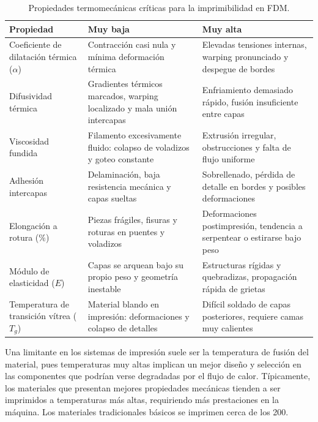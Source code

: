 \begin{table}[h]
  \centering
  \footnotesize
  \begin{tabular}{|p{3cm}|p{5cm}|p{5cm}|}
    \hline
    \textbf{Propiedad} & \textbf{Muy baja} & \textbf{Muy alta} \\
    \hline
    Coeficiente de dilatación térmica (\(\alpha\)) 
      & Contracción casi nula y mínima deformación térmica 
      & Elevadas tensiones internas, warping pronunciado y despegue de bordes \\
    \hline
    Difusividad térmica 
      & Gradientes térmicos marcados, warping localizado y mala unión intercapas 
      & Enfriamiento demasiado rápido, fusión insuficiente entre capas \\
    \hline
    Viscosidad fundida 
      & Filamento excesivamente fluido: colapso de voladizos y goteo constante 
      & Extrusión irregular, obstrucciones y falta de flujo uniforme \\
    \hline
    Adhesión intercapas 
      & Delaminación, baja resistencia mecánica y capas sueltas 
      & Sobrellenado, pérdida de detalle en bordes y posibles deformaciones \\
    \hline
    Elongación a rotura (\(\%\)) 
      & Piezas frágiles, fisuras y roturas en puentes y voladizos 
      & Deformaciones postimpresión, tendencia a serpentear o estirarse bajo peso \\
    \hline
    Módulo de elasticidad (\(E\)) 
      & Capas se arquean bajo su propio peso y geometría inestable 
      & Estructuras rígidas y quebradizas, propagación rápida de grietas \\
    \hline
    Temperatura de transición vítrea (\(T_g\)) 
      & Material blando en impresión: deformaciones y colapso de detalles 
      & Difícil soldado de capas posteriores, requiere camas muy calientes \\
    \hline
  \end{tabular}
  \caption{Propiedades termomecánicas críticas para la imprimibilidad en FDM.}
  \label{tab:propiedades_fdm}
\end{table}

Una limitante en los sistemas de impresión suele ser la temperatura de fusión del material, pues temperaturas muy altas implican un mejor diseño y selección en las componentes que podrían verse degradadas por el flujo de calor. Típicamente, los materiales que presentan mejores propiedades mecánicas tienden a ser imprimidos a temperaturas más altas, requiriendo más prestaciones en la máquina. Los materiales tradicionales básicos se imprimen cerca de los 200.

